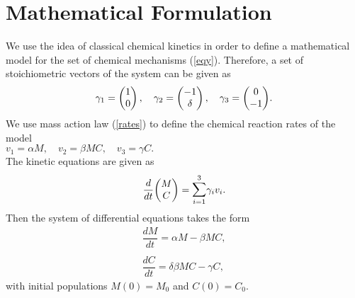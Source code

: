 \documentclass[a4paper,12pt]{article}
\begin{document}
\section{Mathematical Formulation}
We use the idea of classical chemical kinetics in order to define a mathematical model for the set of chemical mechanisms (\ref{eqy}). Therefore, a set of stoichiometric vectors of the system can be given as  
\begin{gather*}
  \setlength{\arraycolsep}{1\arraycolsep}
  \text{$
  \gamma_{1}  =\begin{pmatrix}
 1\\
 0
\end{pmatrix},
\quad  \gamma_{2} =\begin{pmatrix}
-1\\
 \delta
\end{pmatrix},
\quad \gamma_{3} =\begin{pmatrix}
 0\\
-1
\end{pmatrix}$}.
\end{gather*} 
We use mass action law (\ref{rates}) to define the chemical reaction rates of the model\\
$v_{1}=\alpha M ,\quad  v_{2}=\beta MC,\quad  v_{3}=\gamma C .$\\

\noindent The kinetic equations are given as
\begin{equation}
\begin{array}{llll}  
\dfrac{d}{dt}\text{$
\begin{pmatrix}
 M\\
 C
\end{pmatrix}$}=\mathlarger{\mathlarger{\sum\limits}}_{i=1}^{3}\gamma_{i}v_{i}.
\end{array}
\label{eqk1} 
 \end{equation}
Then the system of differential equations takes the form 
\begin{equation}
\begin{array}{llll}  
\dfrac{d M}{dt}=\alpha M - \beta M C,\\
\\
\dfrac{d C}{dt}=\delta \beta M C - \gamma C,
\end{array}
\label{eqk2} 
 \end{equation}
with initial populations $M(0)=M_{0}$ and $C(0)=C_{0}$. \\
\end{document}
